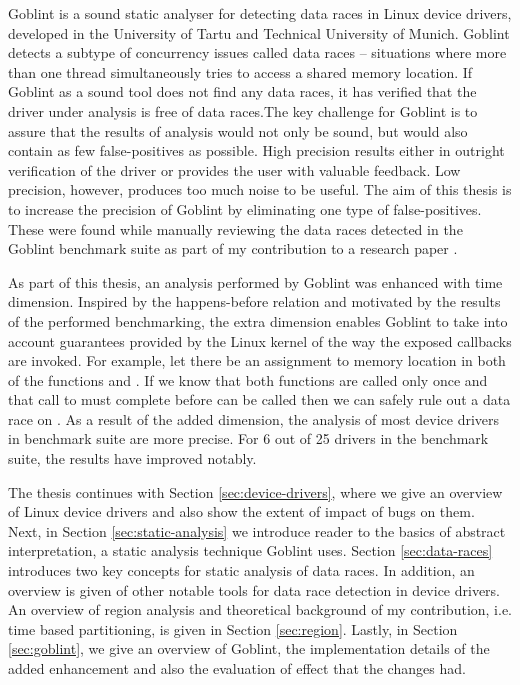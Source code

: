 \documentclass[..thesis.tex]{subfiles}
\begin{document}
Goblint is a sound static analyser for detecting data races in Linux device drivers, developed in the University of Tartu and Technical University of Munich. Goblint detects a subtype of concurrency issues called data races -- situations where more than one thread simultaneously tries to access a shared memory location.
If Goblint as a sound tool does not find any data races, it has verified that the driver under analysis is free of data races.The key challenge for Goblint is to assure that the results of analysis would not only be sound, but would also contain as few false-positives as possible. High precision results either in outright verification of the driver or provides the user with valuable feedback. Low precision, however, produces too much noise to be useful. The aim of this thesis is to increase the precision of Goblint by eliminating one type of false-positives. These were found while manually reviewing the data races detected in the Goblint benchmark suite as part of my contribution to a research paper \cite{vojdani_static_2016}.
  

As part of this thesis, an analysis performed by Goblint was enhanced with time dimension. Inspired by the happens-before relation and motivated by the results of the performed benchmarking,
the extra dimension enables Goblint to take into account guarantees provided by the Linux kernel of the way the exposed callbacks are invoked.
For example, let there be an assignment to memory location  in both of the functions  and . 
If we know that both functions are called only once and that call to  must complete before  can be called then we can safely rule out a data race on .
As a result of the added dimension, the analysis of most device drivers in benchmark suite are more precise. For 6 out of 25 drivers in the benchmark suite,
the results have improved notably.


The thesis continues with Section \ref{sec:device-drivers}, where we give an overview of Linux device drivers and also show the extent of impact of bugs on them.
Next, in Section \ref{sec:static-analysis} we introduce reader to the basics of abstract interpretation, a static analysis technique Goblint uses.
Section \ref{sec:data-races} introduces two key concepts for static analysis of data races.
In addition, an overview is given of other notable tools for data race detection in device drivers. An overview of region analysis and theoretical background of my contribution, i.e.
time based partitioning, is given in Section \ref{sec:region}. Lastly, in Section \ref{sec:goblint}, we give an overview of Goblint,
the implementation details of the added enhancement and also the evaluation of effect that the changes had.  
\end{document}
